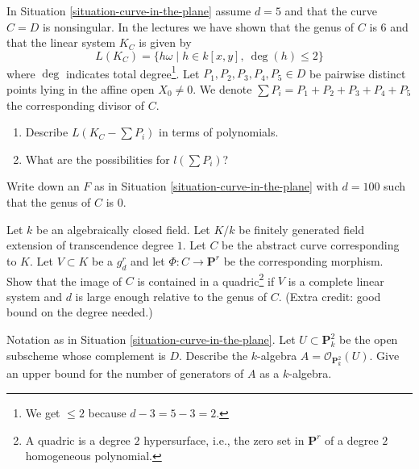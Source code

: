 \begin{exercise}
\label{exercise-smooth-plane-curve-linear-system}
In Situation \ref{situation-curve-in-the-plane} assume $d = 5$
and that the curve $C = D$ is nonsingular. In the lectures we have shown
that the genus of $C$ is $6$ and that the linear system $K_C$ is given by
$$
L(K_C) = \{h\omega \mid h \in k[x, y],\ \deg(h) \leq 2\}
$$
where $\deg$ indicates total degree\footnote{We get $\leq 2$ because
$d - 3 = 5 - 3 = 2$.}. Let $P_1, P_2, P_3, P_4, P_5 \in D$
be pairwise distinct points lying in the affine open $X_0 \not = 0$. We denote
$\sum P_i = P_1 + P_2 + P_3 + P_4 + P_5$ the corresponding divisor of $C$.
\begin{enumerate}
\item Describe $L(K_C - \sum P_i)$ in terms of polynomials.
\item What are the possibilities for $l(\sum P_i)$?
\end{enumerate}
\end{exercise}

\begin{exercise}
\label{exercise-rational-curve-high-degree}
Write down an $F$ as in Situation \ref{situation-curve-in-the-plane}
with $d = 100$ such that the genus of $C$ is $0$.
\end{exercise}

\begin{exercise}
\label{exercise-high-degree-curve-quadratic-equation}
Let $k$ be an algebraically closed field. Let $K/k$ be
finitely generated field extension of transcendence degree $1$.
Let $C$ be the abstract curve corresponding to $K$.
Let $V \subset K$ be a $g^r_d$ and let $\Phi : C \to \mathbf{P}^r$
be the corresponding morphism. Show that the image of $C$
is contained in a quadric\footnote{A quadric is a degree $2$ hypersurface,
i.e., the zero set in $\mathbf{P}^r$ of a degree $2$ homogeneous
polynomial.} if $V$ is a complete linear
system and $d$ is large enough relative to the genus of $C$.
(Extra credit: good bound on the degree needed.)
\end{exercise}

\begin{exercise}
\label{exercise-surjective-map-a2-p2}
Notation as in Situation \ref{situation-curve-in-the-plane}.
Let $U \subset \mathbf{P}^2_k$ be the open subscheme
whose complement is $D$. Describe the $k$-algebra
$A = \mathcal{O}_{\mathbf{P}^2_k}(U)$. Give an upper bound for the
number of generators of $A$ as a $k$-algebra.
\end{exercise}



